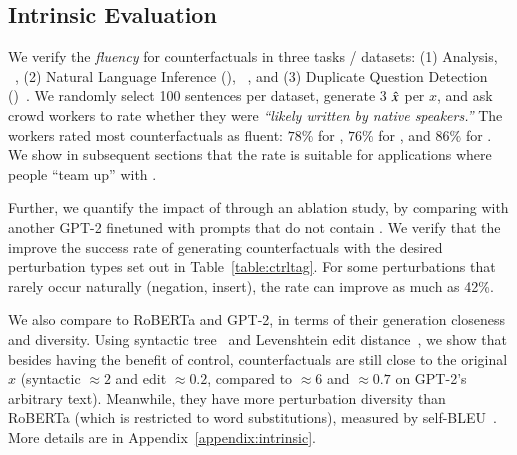 \subsection{Intrinsic Evaluation}
\label{subsec:intrinsic}



We verify the \emph{fluency} for \sysname counterfactuals in three tasks / datasets: (1) \sst Analysis, \dsst~\cite{socher2013recursive},
(2) Natural Language Inference (\nli), \dnli~\cite{bowman-etal-2015-large}, and 
(3) Duplicate Question Detection (\dqqp)~\cite{wang2018glue}.
We randomly select 100 sentences per dataset, generate 3 \sysname $\hat{x}$ per $x$, and ask crowd workers to rate whether they were \emph{``likely written by native speakers.''}
The workers rated most counterfactuals as fluent: $78\%$ for \dsst, $76\%$ for \dqqp, and $86\%$ for \dnli.
We show in subsequent sections that the rate is suitable for applications where people ``team up'' with \sysname.

Further, we quantify the impact of \tagstrs through an ablation study, \ie by comparing \sysname with another GPT-2 finetuned with prompts that do not contain \tagstrshorts.
We verify that the \tagstrshorts improve the success rate of generating counterfactuals with the desired perturbation types set out in Table~\ref{table:ctrltag}.
For some perturbations that rarely occur naturally (\eg negation, insert), the rate can improve as much as 42\%.

We also compare \sysname to RoBERTa and GPT-2, in terms of their generation closeness and diversity.
Using syntactic tree~\cite{zhang1989simple} and Levenshtein edit distance~\cite{levenshtein1966binary}, we show that besides having the benefit of control, \sysname counterfactuals are still close to the original $x$ (syntactic ${\approx}2$ and edit ${\approx}0.2$, compared to ${\approx}6$ and ${\approx}0.7$ on GPT-2's arbitrary text).
Meanwhile, they have more perturbation diversity than RoBERTa (which is restricted to word substitutions), measured by self-BLEU~\cite{zhu2018texygen}.
More details are in Appendix~\ref{appendix:intrinsic}.
